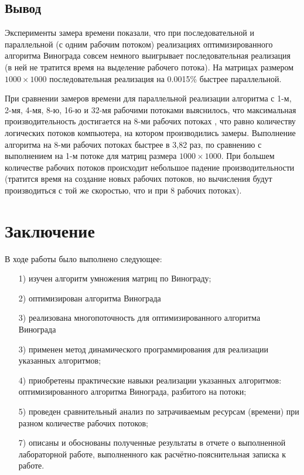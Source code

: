 \documentclass[a4paper,12pt]{article}
\begin{document}
     
        
       \subsection*{Вывод}
       Эксперименты замера времени показали, что при последовательной и параллельной (с одним рабочим потоком) реализациях оптимизированного алгоритма Винограда совсем немного выигрывает последовательная реализация (в ней не тратится время на выделение рабочего потока). На матрицах размером $1000 \times 1000$ последовательная реализация на 0.0015\% быстрее параллельной.
       
        При сравнении замеров времени для параллельной реализации алгоритма с 1-м, 2-мя, 4-мя, 8-ю, 16-ю и 32-мя рабочими потоками выяснилось, что максимальная производительность достигается на 8-ми рабочих потоках , что равно количеству логических потоков компьютера, на котором производились замеры. Выполнение алгоритма на 8-ми рабочих потоках быстрее в 3,82 раз, по сравнению с выполнением на 1-м потоке для матриц размера $1000 \times 1000$. При большем количестве рабочих потоков происходит небольшое падение производительности (тратится время на создание новых рабочих потоков, но вычисления будут производиться с той же скоростью, что и при 8 рабочих потоках).
        
    

\pagebreak
\section*{Заключение}
	В ходе работы было выполнено следующее:
	\begin{enumerate} 
	\item[1)] изучен алгоритм умножения матриц по Винограду;
	\item[2)] оптимизирован алгоритма Винограда
	\item[3)] реализована многопоточность для оптимизированного алгоритма Винограда
	\item[3)] применен метод динамического программирования для реализации указанных алгоритмов;
	\item[4)] приобретены практические навыки реализации указанных алгоритмов: оптимизированного алгоритма Винограда, разбитого на потоки;
	\item[5)] проведен сравнительный анализ по затрачиваемым ресурсам (времени) при разном количестве рабочих потоков;
	\item[7)] описаны и обоснованы полученные результаты в отчете о выполненной лабораторной работе, выполненного как расчётно-пояснительная записка к работе. 
\end{enumerate} 
\end{document}
